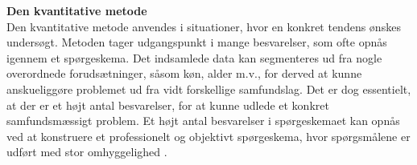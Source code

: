 {\bf Den kvantitative metode}\\
\label{sec:kvantitative_metode}
Den kvantitative metode anvendes i situationer, hvor en konkret tendens ønskes undersøgt. Metoden tager udgangspunkt i mange besvarelser, som ofte opnås igennem et spørgeskema. Det indsamlede data kan segmenteres ud fra nogle overordnede forudsætninger, såsom køn, alder m.v., for derved at kunne anskueliggøre problemet ud fra vidt forskellige samfundslag. Det er dog essentielt, at der er et højt antal besvarelser, for at kunne udlede et konkret samfundsmæssigt problem. Et højt antal besvarelser i spørgeskemaet kan opnås ved at konstruere et professionelt og objektivt spørgeskema, hvor spørgsmålene er udført med stor omhyggelighed \cite{KommunikationItA}. \\